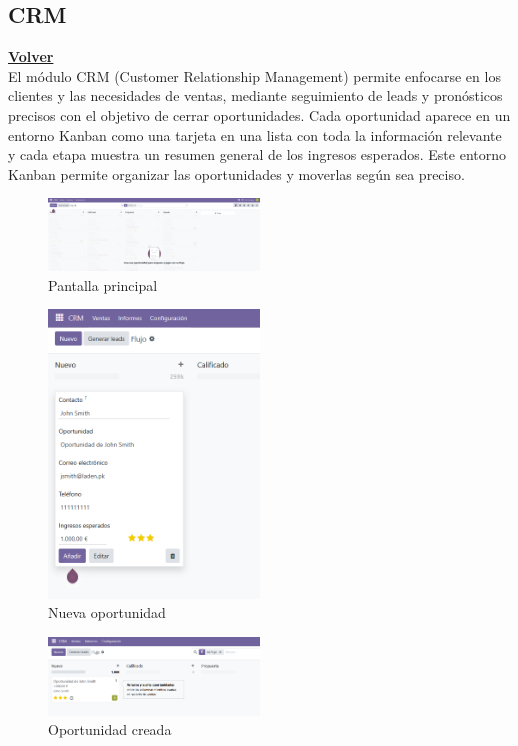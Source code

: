 \documentclass[a4paper,12pt]{article}
\begin{document}
\subsection{CRM}
\hyperlink{anchor-indice}{\textbf{Volver}}\\

El módulo CRM (Customer Relationship Management) permite enfocarse en los clientes y las necesidades de ventas, mediante seguimiento de leads y pronósticos precisos con el objetivo de cerrar oportunidades.
Cada oportunidad aparece en un entorno Kanban como una tarjeta en una lista con toda la información relevante y cada etapa muestra un resumen general de los ingresos esperados.
Este entorno Kanban permite organizar las oportunidades y moverlas según sea preciso.

\begin{figure}[h!]
    \centering
    \includegraphics[width=0.5\textwidth]{pr2odoo66-pantallaPrincipal.png}
    \caption{Pantalla principal}
\end{figure}
\FloatBarrier

\begin{figure}[h!]
    \centering
    \includegraphics[width=0.5\textwidth]{pr2odoo67-nuevaOportunidad.png}
    \caption{Nueva oportunidad}
\end{figure}
\FloatBarrier

\begin{figure}[h!]
    \centering
    \includegraphics[width=0.5\textwidth]{pr2odoo68-oportunidadCreada.png}
    \caption{Oportunidad creada}
\end{figure}
\FloatBarrier
\end{document}
